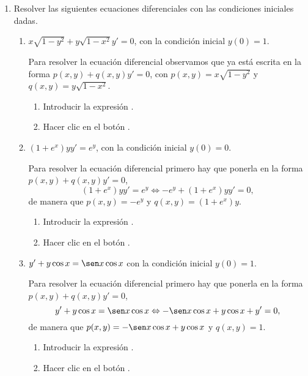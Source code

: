 \begin{enumerate}[leftmargin=*]
\item Resolver las siguientes ecuaciones diferenciales con las condiciones iniciales dadas.
\begin{enumerate}
\item $x\sqrt{1-y^2}+y\sqrt{1-x^2} y'=0$, con la condición inicial $y(0)=1$.
\begin{indicacion}
Para resolver la ecuación diferencial observamos que ya está escrita en la forma $p(x,y)+q(x,y)y'=0$, con
$p(x,y)=x\sqrt{1-y^2}$ y $q(x,y)=y\sqrt{1-x^2}$.
\begin{enumerate}
\item Introducir la expresión .
\item Hacer clic en el botón .
\end{enumerate}
\end{indicacion}


\item $(1+e^x)yy'=e^y$, con la condición inicial $y(0)=0$.
\begin{indicacion}
Para resolver la ecuación diferencial primero hay que ponerla en la forma $p(x,y)+q(x,y)y'=0$,
\[
(1+e^x)yy'=e^y \Leftrightarrow -e^y+(1+e^x)yy'=0,
\]
de manera que $p(x,y)=-e^y$ y $q(x,y)=(1+e^x)y$.
\begin{enumerate}
\item Introducir la expresión .
\item Hacer clic en el botón .
\end{enumerate}
\end{indicacion}


\item $y'+y\cos x=\sen x\cos x$ con la condición inicial $y(0)=1$.
\begin{indicacion}
Para resolver la ecuación diferencial primero hay que ponerla en la forma $p(x,y)+q(x,y)y'=0$,
\[
y'+y\cos x=\sen x\cos x \Leftrightarrow -\sen x\cos x+y\cos x+y'=0,
\]
de manera que $p(x,y)=-\sen x\cos x+y\cos x$ y $q(x,y)=1$.
\begin{enumerate}
\item Introducir la expresión .
\item Hacer clic en el botón .
\end{enumerate}
\end{indicacion}
\end{enumerate}


\end{enumerate}
